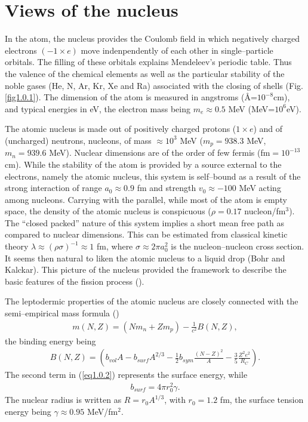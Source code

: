 \documentclass[a4paper,11pt]{book}
\numberwithin{equation}{section}
\numberwithin{figure}{section}
\numberwithin{table}{section}
\begin{document}
\section{Views of the nucleus}
In the atom, the nucleus provides the Coulomb field in which negatively charged electrons $(-1\times e)$ move indenpendently of each other in single--particle orbitals. The filling of these orbitals explains Mendeleev's periodic table. Thus the valence of the chemical elements as well as the particular stability of the noble gases (He, N, Ar, Kr, Xe and Ra) associated with the closing of shells (Fig. \ref{fig1.0.1}). The dimension of the atom is measured in angstroms (\AA=$10^{-8}$cm), and typical energies in eV, the electron mass being $m_e\approx 0.5$ MeV (MeV=$10^6$eV).


The atomic nucleus is made out of positively charged protons ($1\times e$) and of (uncharged) neutrons, nucleons, of mass $\approx 10^3$ MeV ($m_p=938.3$ MeV, $m_n=939.6$ MeV). Nuclear dimensions are of the order of few fermis (fm$=10^{-13}$ cm). While the stability of the atom is provided by a source external to the electrons, namely the atomic nucleus, this system is  self--bound as a result of the strong interaction of range $a_0\approx 0.9$ fm and strength $v_0\approx -100$ MeV acting among nucleons. Carrying with the parallel, while most of the atom is empty space, the density of the atomic nucleus is conspicuous ($\rho=0.17$ nucleon/fm$^3$). The ``closed packed'' nature of this system implies a short mean free path as compared to nuclear dimensions. This can be estimated from classical kinetic theory $\lambda\approx(\rho\sigma)^{-1}\approx1$ fm, where $\sigma\approx 2\pi a_0^2$ is the nucleon--nucleon cross section. It seems then natural to liken the atomic nucleus to a liquid drop (Bohr and Kalckar).
This picture of the nucleus provided the framework to describe the basic features of the fission process (\cite{Meitner:39,Bohr:39}). 



The leptodermic properties of the atomic nucleus are closely connected with the semi--empirical mass formula (\cite{Weizsacker:35})
\begin{align}
m(N,Z)=(Nm_n+Zm_p)-\frac{1}{c^2}B(N,Z),
\end{align}
the binding energy being
\begin{align}\label{eq1.0.2}
B(N,Z)=\left(b_{vol}A-b_{surf}A^{2/3}-\frac{1}{2} b_{sym}\frac{(N-Z)^2}{A}-\frac{3}{5}\frac{Z^2e^2}{R_C}\right).
\end{align}
The second term in (\ref{eq1.0.2}) represents the surface energy, while
\begin{align}\label{eq1.0.3}
b_{surf}=4\pi r_0^2\gamma.
\end{align}
The nuclear radius is written as $R=r_0A^{1/3}$, with $r_0=1.2$ fm, the surface tension energy being $\gamma\approx 0.95$ MeV/fm$^2$.
\end{document}
